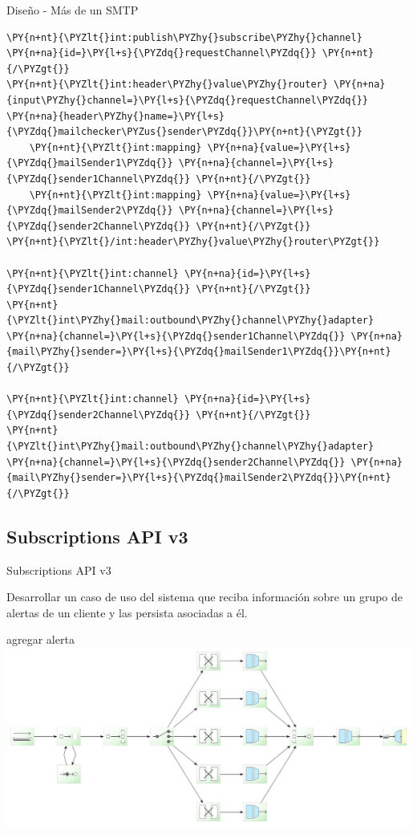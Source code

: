 \documentclass{beamer}
\begin{document}
\begin{frame}[fragile]{Diseño - Más de un SMTP}
\begin{Verbatim}[fontsize=\tiny,commandchars=\\\{\}]
\PY{n+nt}{\PYZlt{}int:publish\PYZhy{}subscribe\PYZhy{}channel} \PY{n+na}{id=}\PY{l+s}{\PYZdq{}requestChannel\PYZdq{}} \PY{n+nt}{/\PYZgt{}}
\PY{n+nt}{\PYZlt{}int:header\PYZhy{}value\PYZhy{}router} \PY{n+na}{input\PYZhy{}channel=}\PY{l+s}{\PYZdq{}requestChannel\PYZdq{}} \PY{n+na}{header\PYZhy{}name=}\PY{l+s}{\PYZdq{}mailchecker\PYZus{}sender\PYZdq{}}\PY{n+nt}{\PYZgt{}}
    \PY{n+nt}{\PYZlt{}int:mapping} \PY{n+na}{value=}\PY{l+s}{\PYZdq{}mailSender1\PYZdq{}} \PY{n+na}{channel=}\PY{l+s}{\PYZdq{}sender1Channel\PYZdq{}} \PY{n+nt}{/\PYZgt{}}
    \PY{n+nt}{\PYZlt{}int:mapping} \PY{n+na}{value=}\PY{l+s}{\PYZdq{}mailSender2\PYZdq{}} \PY{n+na}{channel=}\PY{l+s}{\PYZdq{}sender2Channel\PYZdq{}} \PY{n+nt}{/\PYZgt{}}
\PY{n+nt}{\PYZlt{}/int:header\PYZhy{}value\PYZhy{}router\PYZgt{}}

\PY{n+nt}{\PYZlt{}int:channel} \PY{n+na}{id=}\PY{l+s}{\PYZdq{}sender1Channel\PYZdq{}} \PY{n+nt}{/\PYZgt{}}
\PY{n+nt}{\PYZlt{}int\PYZhy{}mail:outbound\PYZhy{}channel\PYZhy{}adapter} \PY{n+na}{channel=}\PY{l+s}{\PYZdq{}sender1Channel\PYZdq{}} \PY{n+na}{mail\PYZhy{}sender=}\PY{l+s}{\PYZdq{}mailSender1\PYZdq{}}\PY{n+nt}{/\PYZgt{}}

\PY{n+nt}{\PYZlt{}int:channel} \PY{n+na}{id=}\PY{l+s}{\PYZdq{}sender2Channel\PYZdq{}} \PY{n+nt}{/\PYZgt{}}
\PY{n+nt}{\PYZlt{}int\PYZhy{}mail:outbound\PYZhy{}channel\PYZhy{}adapter} \PY{n+na}{channel=}\PY{l+s}{\PYZdq{}sender2Channel\PYZdq{}} \PY{n+na}{mail\PYZhy{}sender=}\PY{l+s}{\PYZdq{}mailSender2\PYZdq{}}\PY{n+nt}{/\PYZgt{}}
\end{Verbatim}
\end{frame}

\subsection{Subscriptions API v3}
\begin{frame}
\begin{center}
\Large{Subscriptions API v3}
\end{center}
Desarrollar un caso de uso del sistema que reciba información sobre un grupo de alertas de un cliente y las persista asociadas a él.
\end{frame}

\begin{frame}{agregar alerta}
\includegraphics[width=1.0\linewidth]{subs-v3-add}
\end{frame}
\end{document}
